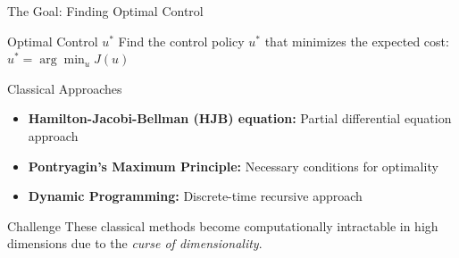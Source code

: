 \documentclass[aspectratio=169,xcolor=dvipsnames]{beamer}
\begin{document}
\begin{frame}{The Goal: Finding Optimal Control}
    \begin{block}{Optimal Control $u^*$}
        Find the control policy $u^*$ that minimizes the expected cost: $u^* = \arg\min_u J(u)$
    \end{block}
    
    \vspace{0.3cm}
    
    \begin{block}{Classical Approaches}
        \begin{itemize}
            \item \textbf{Hamilton-Jacobi-Bellman (HJB) equation:} Partial differential equation approach
            \item \textbf{Pontryagin's Maximum Principle:} Necessary conditions for optimality
            \item \textbf{Dynamic Programming:} Discrete-time recursive approach
        \end{itemize}
    \end{block}
    
    \vspace{0.3cm}
    
    \begin{alertblock}{Challenge}
        These classical methods become computationally intractable in high dimensions due to the \textit{curse of dimensionality}.
    \end{alertblock}
\end{frame}



\end{document}
